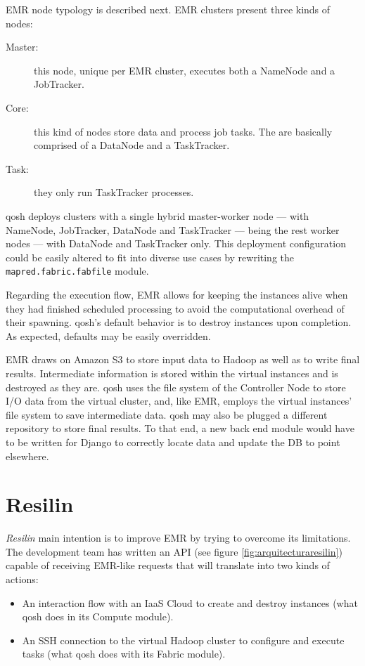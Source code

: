 EMR node typology is described next. EMR clusters present three kinds of nodes:

\begin{description}
    \item[Master:] this node, unique per EMR cluster, executes both a NameNode and a JobTracker.
    \item[Core:] this kind of nodes store data and process job tasks. The are basically comprised of a DataNode and a TaskTracker.
    \item[Task:] they only run TaskTracker processes.
\end{description}

qosh deploys clusters with a single hybrid master-worker node --- with NameNode, JobTracker, DataNode and TaskTracker --- being the rest worker nodes --- with DataNode and TaskTracker only. This deployment configuration could be easily altered to fit into diverse use cases by rewriting the \texttt{mapred.fabric.fabfile} module.

Regarding the execution flow, EMR allows for keeping the instances alive when they had finished scheduled processing to avoid the computational overhead of their spawning. qosh's default behavior is to destroy instances upon completion. As expected, defaults may be easily overridden.

EMR draws on Amazon S3 to store input data to Hadoop as well as to write final results. Intermediate information is stored within the virtual instances and is destroyed as they are. qosh uses the file system of the Controller Node to store I/O data from the virtual cluster, and, like EMR, employs the virtual instances' file system to save intermediate data. qosh may also be plugged a different repository to store final results. To that end, a new back end module would have to be written for Django to correctly locate data and update the DB to point elsewhere.

\section{Resilin}\label{sec:resilin}
\noindent \emph{Resilin} \cite{resilin} main intention is to improve EMR by trying to overcome its limitations. The development team has written an API (see figure \ref{fig:arquitecturaresilin}) capable of receiving EMR-like requests that will translate into two kinds of actions:

\begin{itemize}
    \item An interaction flow with an IaaS Cloud to create and destroy instances (what qosh does in its Compute module).
    \item An SSH connection to the virtual Hadoop cluster to configure and execute tasks (what qosh does with its Fabric module).
\end{itemize}

